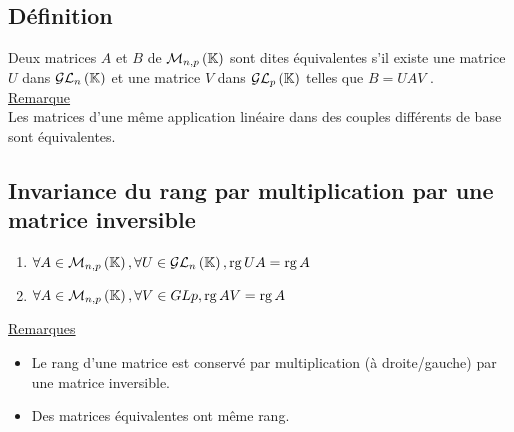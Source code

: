 \subsection{Définition}
\begin{defi}
    Deux matrices \(A\) et \(B\) de \(\M{n,p}\) sont dites équivalentes s’il existe une matrice \(U\) dans \(\GL{n}\) et une matrice \(V\) dans \(\GL{p}\) telles que \(B = U AV\) .\\
    \underline{Remarque} \\
    Les matrices d’une même application linéaire dans des couples différents de base sont équivalentes.
\end{defi}
\subsection{Invariance du rang par multiplication par une matrice inversible}
\begin{defprop}
    \begin{enumerate}
        \item \(\forall A \in \M{n,p}, \forall U \in \GL{n}, \rg U A = \rg A\)
        \item \(\forall A \in \M{n,p}, \forall V \in GL{p}, \rg AV = \rg A\)
    \end{enumerate}
    \underline{Remarques} \\
    \begin{itemize}
        \item Le rang d’une matrice est conservé par multiplication (à droite/gauche) par une matrice inversible.
        \item Des matrices équivalentes ont même rang.
    \end{itemize}
\end{defprop}
